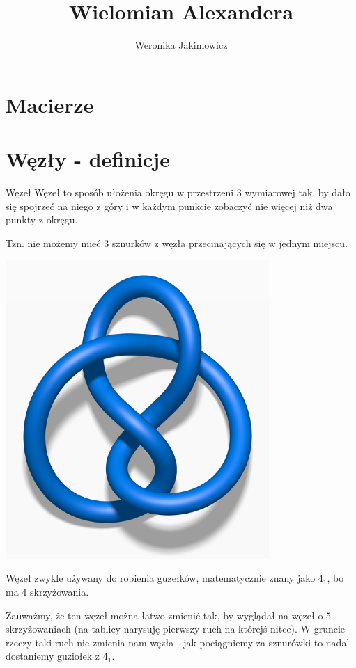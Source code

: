 \documentclass{article}
\title{Wielomian Alexandera}
\author{Weronika Jakimowicz}
\date{}
\begin{document}
\maketitle 

\section{Macierze}

\section{Węzły - definicje}

\begin{definition}{Węzeł}{}
Węzeł to sposób ułożenia okręgu w przestrzeni $3$ wymiarowej tak, by dało się spojrzeć na niego z góry i w każdym punkcie zobaczyć nie więcej niż dwa punkty z okręgu. 

Tzn. nie możemy mieć $3$ sznurków z węzła przecinających się w jednym miejscu.
\end{definition}

\begin{center}
  \includegraphics[width=10cm]{knot_4_1.png}

  Węzeł zwykle używany do robienia guzełków, matematycznie znany jako $4_1$, bo ma $4$ skrzyżowania.
\end{center}

Zauważmy, że ten węzeł można łatwo zmienić tak, by wyglądał na węzeł o $5$ skrzyżowaniach (na tablicy narysuję pierwszy ruch na którejś nitce). W gruncie rzeczy taki ruch nie zmienia nam węzła - jak pociągniemy za sznurówki to nadal dostaniemy guziołek z $4_1$.
\end{document}
